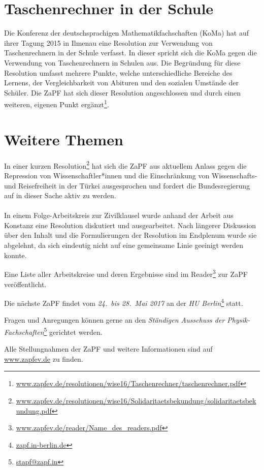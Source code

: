 \section*{Taschenrechner in der Schule}
Die Konferenz der deutschsprachigen Mathematikfachschaften (KoMa) hat auf ihrer Tagung 2015 in Ilmenau eine Resolution zur Verwendung von Taschenrechnern in der Schule 
verfasst. In dieser spricht sich die KoMa gegen die Verwendung von Taschenrechnern in Schulen aus. Die Begründung für diese Resolution umfasst mehrere Punkte, 
welche unterschiedliche Bereiche des Lernens, der Vergleichbarkeit von Abituren und den sozialen Umstände der Schüler. Die ZaPF hat sich dieser Resolution 
angeschlossen und durch einen weiteren, eigenen Punkt ergänzt\footnote{\href{https://zapfev.de/resolutionen/wise16/Taschenrechner/taschenrechner.pdf}{\url{www.zapfev.de/resolutionen/wise16/Taschenrechner/taschenrechner.pdf}}}. 
		
\section*{Weitere Themen}
In einer kurzen Resolution\footnote{\href{https://zapfev.de/resolutionen/wise16/Solidaritaetsbekundung/solidaritaetsbekundung.pdf}{\url{www.zapfev.de/resolutionen/wise16/Solidaritaetsbekundung/solidaritaetsbekundung.pdf}}} 
hat sich die ZaPF aus aktuellem Anlass gegen die Repression von Wissenschaftler*innen und die Einschränkung von Wissenschafts- und Reisefreiheit in der Türkei ausgesprochen 
und fordert die Bundesregierung auf in dieser Sache aktiv zu werden.\\ \\
In einem Folge-Arbeitskreis zur Zivilklausel wurde anhand der Arbeit aus Konstanz eine Resolution diskutiert und ausgearbeitet. Nach längerer Diskussion über den 
Inhalt und die Formulierungen der Resolution im Endplenum wurde sie abgelehnt, da sich eindeutig nicht auf eine gemeinsame Linie geeinigt werden konnte.
				
		
Eine Liste aller Arbeitskreise und deren Ergebnisse sind im
Reader\footnote{\href{http://www.zapfev.de/reader/Name_des_readers.pdf}{\url{www.zapfev.de/reader/Name_des_readers.pdf}}}
zur ZaPF veröffentlicht.
		
\vfill
		
Die nächste ZaPF findet vom \emph{24.\ bis 28.\ Mai 2017} an der  \emph{HU Berlin}\footnote{\href{zapf.in-berlin.de}{\url{zapf.in-berlin.de}}} statt.
		
Fragen und Anregungen können gerne an den \emph{Ständigen Ausschuss der Physik-Fachschaften}\footnote{\href{mailto:stapf@zapf.in}{\url{stapf@zapf.in}}} gerichtet werden.
		
Alle Stellungnahmen der ZaPF und weitere Informationen sind auf \href{http://www.zapfev.de}{\url{www.zapfev.de}} zu finden.
		
		
		
		
